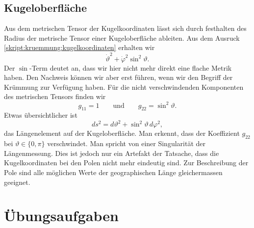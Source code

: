 \subsection{Kugeloberfläche}
Aus dem metrischen Tensor der Kugelkoordinaten lässt sich durch festhalten
des Radius der metrische Tensor einer Kugeloberfläche ableiten.
Aus dem Ausruck \eqref{skript:kruemmung:kugelkoordinaten}
erhalten wir
\[
\dot\vartheta^2+\dot\varphi^2\sin^2\vartheta.
\]
Der $\sin$-Term deutet an, dass wir hier nicht mehr direkt eine flache
Metrik haben.
Den Nachweis können wir aber erst führen, wenn wir den Begriff der
Krümmung zur Verfügung haben.
Für die nicht verschwindenden Komponenten des metrischen Tensors
finden wir
\[
g_{11} = 1
\qquad\text{und}\qquad
g_{22}=\sin^2\vartheta.
\]
Etwas übersichtlicher ist 
\[
ds^2
=
d\vartheta^2 + \sin^2\vartheta\,d\varphi^2,
\]
das Längenelement auf der Kugeloberfläche.
Man erkennt, dass der Koeffizient $g_{22}$ bei $\vartheta \in\{0,\pi\}$
verschwindet.
Man spricht von einer Singularität der Längenmessung.
Dies ist jedoch nur ein Artefakt der Tatsache, dass die Kugelkoordinaten
bei den Polen nicht mehr eindeutig sind.
Zur Beschreibung der Pole sind alle möglichen Werte der geographischen
Länge gleichermassen geeignet.

\section{Übungsaufgaben}

